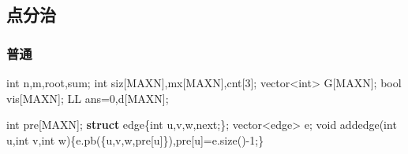 \documentclass[
]{article}
\newenvironment{Shaded}{}{}
\newcommand{\DataTypeTok}[1]{\textcolor[rgb]{0.56,0.13,0.00}{#1}}
\newcommand{\DecValTok}[1]{\textcolor[rgb]{0.25,0.63,0.44}{#1}}
\newcommand{\KeywordTok}[1]{\textcolor[rgb]{0.00,0.44,0.13}{\textbf{#1}}}
\newcommand{\NormalTok}[1]{#1}
\begin{document}
\hypertarget{ux70b9ux5206ux6cbb}{%
\subsection{点分治}\label{ux70b9ux5206ux6cbb}}

\hypertarget{ux666eux901a-2}{%
\subsubsection{普通}\label{ux666eux901a-2}}

\begin{Shaded}
\begin{Highlighting}[]
\DataTypeTok{int}\NormalTok{ n,m,root,sum;}
\DataTypeTok{int}\NormalTok{ siz[MAXN],mx[MAXN],cnt[}\DecValTok{3}\NormalTok{];}
\NormalTok{vector\textless{}}\DataTypeTok{int}\NormalTok{\textgreater{} G[MAXN];}
\DataTypeTok{bool}\NormalTok{ vis[MAXN];}
\NormalTok{LL ans=}\DecValTok{0}\NormalTok{,d[MAXN];}

\DataTypeTok{int}\NormalTok{ pre[MAXN];}
\KeywordTok{struct}\NormalTok{ edge\{}\DataTypeTok{int}\NormalTok{ u,v,w,next;\};}
\NormalTok{vector\textless{}edge\textgreater{} e;}
\DataTypeTok{void}\NormalTok{ addedge(}\DataTypeTok{int}\NormalTok{ u,}\DataTypeTok{int}\NormalTok{ v,}\DataTypeTok{int}\NormalTok{ w)\{e.pb(\{u,v,w,pre[u]\}),pre[u]=e.size(){-}}\DecValTok{1}\NormalTok{;\}}


\end{Highlighting}
\end{Shaded}
\end{document}
